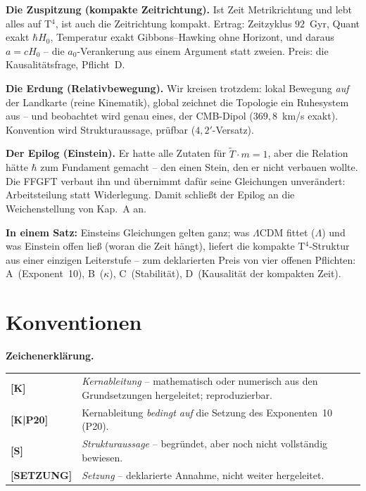 \documentclass[11pt]{report}
\begin{document}
\textbf{Die Zuspitzung (kompakte Zeitrichtung).} Ist Zeit
Metrikrichtung und lebt alles auf T$^4$, ist auch die Zeitrichtung
kompakt. Ertrag: Zeitzyklus $92$~Gyr, Quant exakt $\hbar H_0$,
Temperatur exakt Gibbons--Hawking ohne Horizont, und daraus
$a = cH_0$ -- die $a_0$-Verankerung aus einem Argument statt
zweien. Preis: die Kausalitätsfrage, Pflicht~D.

\textbf{Die Erdung (Relativbewegung).} Wir kreisen trotzdem:
lokal Bewegung \emph{auf} der Landkarte (reine Kinematik), global
zeichnet die Topologie ein Ruhesystem aus -- und beobachtet wird
genau eines, der CMB-Dipol ($369{,}8$~km/s exakt). Konvention wird
Strukturaussage, prüfbar ($4{,}2'$-Versatz).

\textbf{Der Epilog (Einstein).} Er hatte alle Zutaten für
$\tilde T \cdot m = 1$, aber die Relation hätte $\hbar$ zum
Fundament gemacht -- den einen Stein, den er nicht verbauen wollte.
Die FFGFT verbaut ihn und übernimmt dafür seine Gleichungen
unverändert: Arbeitsteilung statt Widerlegung. Damit schließt der
Epilog an die Weichenstellung von Kap.~A an.

\medskip
\noindent\textbf{In einem Satz:} Einsteins Gleichungen gelten
ganz; was $\Lambda$CDM fittet ($\Lambda$) und was Einstein offen
ließ (woran die Zeit hängt), liefert die kompakte T$^4$-Struktur
aus einer einzigen Leiterstufe -- zum deklarierten Preis von vier
offenen Pflichten: A~(Exponent~10), B~($\kappa$), C~(Stabilität),
D~(Kausalität der kompakten Zeit).

\section*{Konventionen}

\noindent\textbf{Zeichenerklärung.}

\medskip
\begin{tabular}{@{}lp{11cm}}
\textbf{[K]}       & \emph{Kernableitung} -- mathematisch oder numerisch
                     aus den Grundsetzungen hergeleitet; reproduzierbar. \\[4pt]
\textbf{[K|P20]} & Kernableitung \emph{bedingt auf} die Setzung
                     des Exponenten~10 (P20). \\[4pt]
\textbf{[S]}       & \emph{Strukturaussage} -- begründet, aber noch nicht
                     vollständig bewiesen. \\[4pt]
\textbf{[SETZUNG]} & \emph{Setzung} -- deklarierte Annahme, nicht weiter
                     hergeleitet. \\
\end{tabular}
\end{document}
